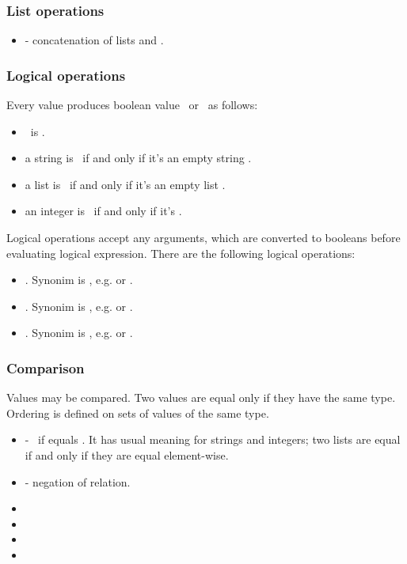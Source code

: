 \subsubsection{List operations}

\begin{itemize}
\item {} - concatenation of lists  and .
\end{itemize}

\subsubsection{Logical operations}
Every value produces boolean value \true\ or \false\ as follows:
\begin{itemize}
\item \none\ is \false.
\item a string is \false\ if and only if it's an empty string .
\item a list is \false\ if and only if it's an empty list \code{[]}.
\item an integer is \false\ if and only if it's .
\end{itemize}

Logical operations accept any arguments, which are converted to booleans
before evaluating logical expression. There are the following logical 
operations:

\begin{itemize}
\item {}. Synonim is \code{\&\&}, e.g.  or .
\item {}. Synonim is \code{||}, e.g.  or .
\item {}. Synonim is \code{!}, e.g.  or .
\end{itemize}

\subsubsection{Comparison}
Values may be compared. Two values are equal only if they have the same type.
Ordering is defined on sets of values of the same type.
\begin{itemize}
\item {} - \true\ if  equals . It has usual 
meaning for strings and integers; two lists are equal if and only if they are
equal element-wise.
\item {} - negation of \code{==} relation.
\item {}
\item {}
\item {}
\item {}
\end{itemize}


